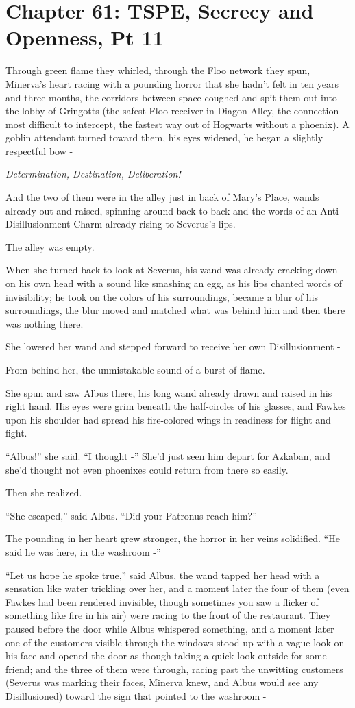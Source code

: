 \chapter{Chapter 61: TSPE, Secrecy and Openness, Pt 11}
Through green flame they whirled, through the Floo network they spun,
Minerva's heart racing with a pounding horror that she hadn't felt in
ten years and three months, the corridors between space coughed and spit
them out into the lobby of Gringotts (the safest Floo receiver in Diagon
Alley, the connection most difficult to intercept, the fastest way out
of Hogwarts without a phoenix). A goblin attendant turned toward them,
his eyes widened, he began a slightly respectful bow -

\emph{Determination, Destination, Deliberation!}

And the two of them were in the alley just in back of Mary's Place,
wands already out and raised, spinning around back-to-back and the words
of an Anti-Disillusionment Charm already rising to Severus's lips.

The alley was empty.

When she turned back to look at Severus, his wand was already cracking
down on his own head with a sound like smashing an egg, as his lips
chanted words of invisibility; he took on the colors of his
surroundings, became a blur of his surroundings, the blur moved and
matched what was behind him and then there was nothing there.

She lowered her wand and stepped forward to receive her own
Disillusionment -

From behind her, the unmistakable sound of a burst of flame.

She spun and saw Albus there, his long wand already drawn and raised in
his right hand. His eyes were grim beneath the half-circles of his
glasses, and Fawkes upon his shoulder had spread his fire-colored wings
in readiness for flight and fight.

``Albus!'' she said. ``I thought -'' She'd just seen him depart for
Azkaban, and she'd thought not even phoenixes could return from there so
easily.

Then she realized.

``She escaped,'' said Albus. ``Did your Patronus reach him?''

The pounding in her heart grew stronger, the horror in her veins
solidified. ``He said he was here, in the washroom -''

``Let us hope he spoke true,'' said Albus, the wand tapped her head with
a sensation like water trickling over her, and a moment later the four
of them (even Fawkes had been rendered invisible, though sometimes you
saw a flicker of something like fire in his air) were racing to the
front of the restaurant. They paused before the door while Albus
whispered something, and a moment later one of the customers visible
through the windows stood up with a vague look on his face and opened
the door as though taking a quick look outside for some friend; and the
three of them were through, racing past the unwitting customers (Severus
was marking their faces, Minerva knew, and Albus would see any
Disillusioned) toward the sign that pointed to the washroom -

